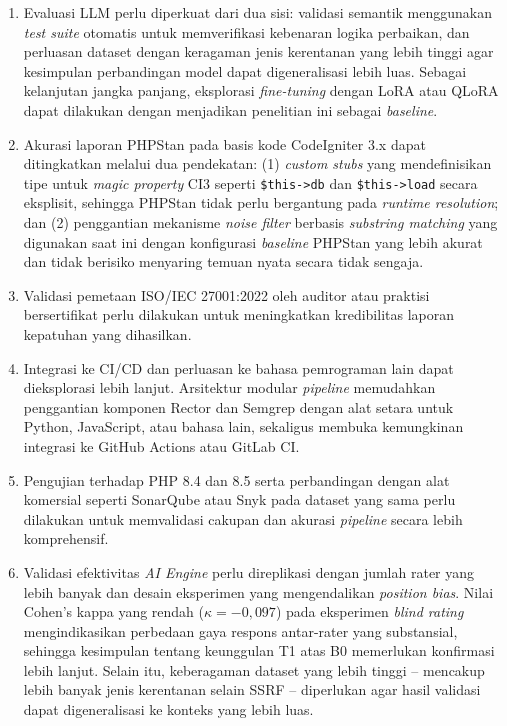 \begin{enumerate}
    \item Evaluasi LLM perlu diperkuat dari dua sisi: 
    validasi semantik menggunakan \textit{test suite} otomatis 
    untuk memverifikasi kebenaran logika perbaikan, dan 
    perluasan dataset dengan keragaman jenis kerentanan yang 
    lebih tinggi agar kesimpulan perbandingan model dapat 
    digeneralisasi lebih luas. Sebagai kelanjutan jangka 
    panjang, eksplorasi \textit{fine-tuning} dengan LoRA atau 
    QLoRA dapat dilakukan dengan menjadikan penelitian ini sebagai \textit{baseline}.

    \item Akurasi laporan PHPStan pada basis kode
CodeIgniter 3.x dapat ditingkatkan melalui dua pendekatan:
(1) \textit{custom stubs} yang mendefinisikan tipe untuk
\textit{magic property} CI3 seperti \texttt{\$this->db} dan
\texttt{\$this->load} secara eksplisit, sehingga PHPStan
tidak perlu bergantung pada \textit{runtime resolution};
dan (2) penggantian mekanisme \textit{noise filter} berbasis
\textit{substring matching} yang digunakan saat ini dengan
konfigurasi \textit{baseline} PHPStan yang lebih akurat dan
tidak berisiko menyaring temuan nyata secara tidak sengaja.


    \item Validasi pemetaan ISO/IEC 27001:2022 oleh 
    auditor atau praktisi bersertifikat perlu dilakukan untuk 
    meningkatkan kredibilitas laporan kepatuhan yang dihasilkan.

    \item Integrasi ke CI/CD dan perluasan ke bahasa 
    pemrograman lain dapat dieksplorasi lebih lanjut. Arsitektur modular 
    \textit{pipeline} memudahkan penggantian komponen Rector dan 
    Semgrep dengan alat setara untuk Python, JavaScript, atau 
    bahasa lain, sekaligus membuka kemungkinan integrasi ke 
    GitHub Actions atau GitLab CI.

    \item Pengujian terhadap PHP 8.4 dan 8.5 serta
    perbandingan dengan alat komersial seperti SonarQube atau
    Snyk pada dataset yang sama perlu dilakukan untuk memvalidasi
    cakupan dan akurasi \textit{pipeline} secara lebih komprehensif.

    \item Validasi efektivitas \textit{AI Engine} perlu direplikasi
    dengan jumlah rater yang lebih banyak dan desain eksperimen yang
    mengendalikan \textit{position bias}. Nilai Cohen's kappa yang
    rendah ($\kappa = {-0{,}097}$) pada eksperimen \textit{blind
    rating} mengindikasikan perbedaan gaya respons antar-rater yang
    substansial, sehingga kesimpulan tentang keunggulan T1 atas B0
    memerlukan konfirmasi lebih lanjut. Selain itu, keberagaman dataset
    yang lebih tinggi -- mencakup lebih banyak jenis kerentanan selain
    SSRF -- diperlukan agar hasil validasi dapat digeneralisasi ke
    konteks yang lebih luas.
\end{enumerate}